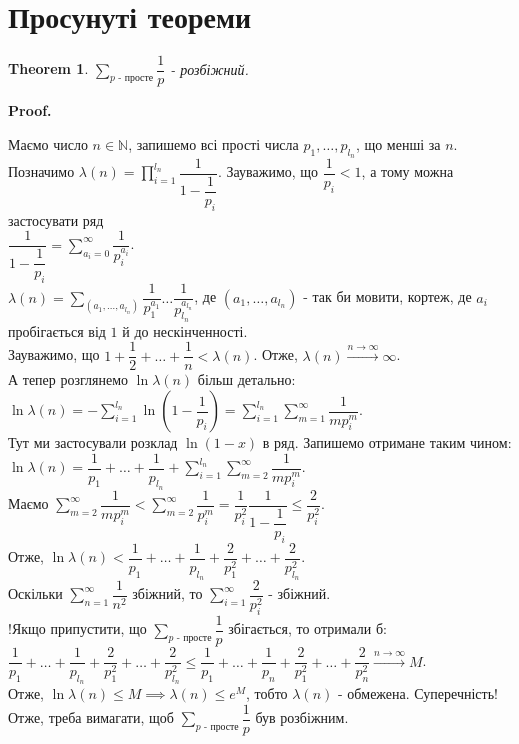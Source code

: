 \documentclass[a4paper, 10pt]{article}
\makeatletter
\theoremstyle{theoremdd}
\newtheorem{theorem}{Theorem}[subsection]
\theoremstyle{theoremdd}
\theoremstyle{theoremdd}
\theoremstyle{theoremdd}
\theoremstyle{theoremdd}
\theoremstyle{theoremdd}
\theoremstyle{theoremdd}
\theoremstyle{theoremdd}
\renewenvironment{proof}[1][Proof.\\]{\par
\pushQED{\hfill \qed}%
\normalfont \topsep6\p@\@plus6\p@\relax
\trivlist
\item\relax
{\bfseries
#1\@addpunct{.}}\hspace\labelsep\ignorespaces
}{%
\popQED\endtrivlist\@endpefalse
}
\makeatother
\begin{document}
\section{Просунуті теореми}
\begin{theorem}
$\displaystyle\sum_{p \text{ - просте}} \dfrac{1}{p}$ - розбіжний.
\end{theorem}

\begin{proof}
Маємо число $n \in \mathbb{N}$, запишемо всі прості числа $p_1,\dots,p_{l_n}$, що менші за $n$. Позначимо $\lambda(n) = \displaystyle\prod_{i=1}^{l_n} \dfrac{1}{1-\dfrac{1}{p_i}}$. Зауважимо, що $\dfrac{1}{p_i} < 1$, а тому можна застосувати ряд\\
$\dfrac{1}{1-\dfrac{1}{p_i}} = \displaystyle\sum_{a_i=0}^\infty \dfrac{1}{p_i^{a_i}}$.\\
$\lambda(n) = \displaystyle\sum_{(a_1,\dots,a_{l_n})} \dfrac{1}{p_1^{a_1}} \dots \dfrac{1}{p_{l_n}^{a_{l_n}}}$, де $(a_1,\dots,a_{l_n})$ - так би мовити, кортеж, де $a_i$ пробігається від $1$ й до нескінченності.\\
Зауважимо, що $1+\dfrac{1}{2}+\dots+\dfrac{1}{n} < \lambda(n)$. Отже, $\lambda(n) \overset{n \to \infty}{\to} \infty$.\\
А тепер розглянемо $\ln \lambda(n)$ більш детально:\\
$\ln \lambda(n) = -\displaystyle\sum_{i=1}^{l_n} \ln\left( 1 - \dfrac{1}{p_i} \right) = \sum_{i=1}^{l_n} \sum_{m=1}^\infty \dfrac{1}{mp_i^{m}}$.\\
Тут ми застосували розклад $\ln(1-x)$ в ряд. Запишемо отримане таким чином:\\
$\displaystyle\ln \lambda(n) = \dfrac{1}{p_1} + \dots + \dfrac{1}{p_{l_n}} + \sum_{i=1}^{l_n} \sum_{m=2}^\infty \dfrac{1}{mp_i^{m}}$.\\
Маємо $\displaystyle\sum_{m=2}^\infty \dfrac{1}{mp_i^m} < \sum_{m=2}^\infty \dfrac{1}{p_i^m} = \dfrac{1}{p_i^2} \dfrac{1}{1-\dfrac{1}{p_i}} \leq \dfrac{2}{p_i^2}$.\\
Отже, $\ln \lambda(n) < \dfrac{1}{p_1} + \dots + \dfrac{1}{p_{l_n}} + \dfrac{2}{p_1^2} + \dots + \dfrac{2}{p_{l_n}^2}$.\\
Оскільки $\displaystyle\sum_{n=1}^\infty \dfrac{1}{n^2}$ збіжний, то $\displaystyle\sum_{i=1}^\infty \dfrac{2}{p_i^2}$ - збіжний.\\
!Якщо припустити, що $\displaystyle\sum_{p \text{ - просте}} \dfrac{1}{p}$ збігається, то отримали б:\\
$\dfrac{1}{p_1} + \dots + \dfrac{1}{p_{l_n}} + \dfrac{2}{p_1^2} + \dots + \dfrac{2}{p_{l_n}^2} \leq \dfrac{1}{p_1} + \dots + \dfrac{1}{p_{n}} + \dfrac{2}{p_1^2} + \dots + \dfrac{2}{p_{n}^2} \overset{n \to \infty}{\to} M$.\\
Отже, $\ln \lambda(n) \leq M \implies \lambda(n) \leq e^M$, тобто $\lambda(n)$ - обмежена. Суперечність!\\
Отже, треба вимагати, щоб $\displaystyle\sum_{p \text{ - просте}} \dfrac{1}{p}$ був розбіжним.
\end{proof}
\end{document}
